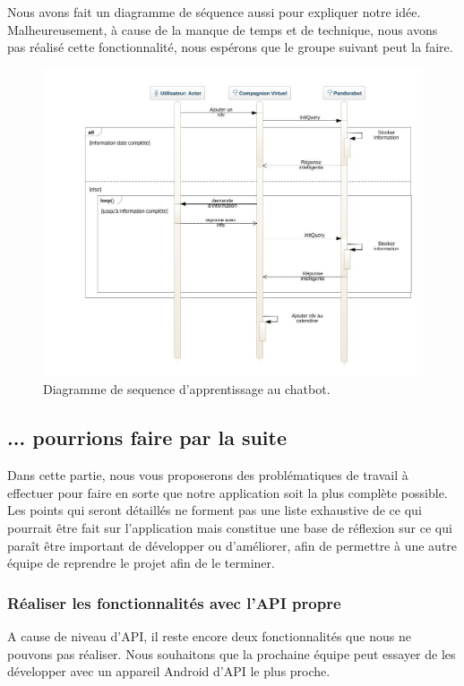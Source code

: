 \indent Nous avons fait un diagramme de séquence aussi pour expliquer notre idée. Malheureusement, à cause de la manque de temps et de technique, nous avons pas réalisé cette fonctionnalité, nous espérons que le groupe suivant peut la faire. 
\newpage
\begin{figure}[ht]
\centering
\includegraphics[width=1\linewidth]{./diagrammes/SequenceDiagram_multi_conversation.jpeg}
\caption{Diagramme de sequence d'apprentissage au chatbot.\label{fig4}}
\end{figure}

\subsection{... pourrions faire par la suite}
\indent Dans cette partie, nous vous proposerons des problématiques de travail à effectuer pour faire en sorte que notre application soit la plus complète possible. Les points qui seront détaillés ne forment pas une liste exhaustive de ce qui pourrait être fait sur l'application mais constitue une base de réflexion sur ce qui paraît être important de développer ou d'améliorer, afin de permettre à une autre équipe de reprendre le projet afin de le terminer.

\subsubsection{Réaliser les fonctionnalités avec l'API propre}

\indent A cause de niveau d'API, il reste encore deux fonctionnalités que nous ne pouvons pas réaliser. Nous souhaitons que la prochaine équipe peut essayer de les développer avec un appareil Android d'API le plus proche.

